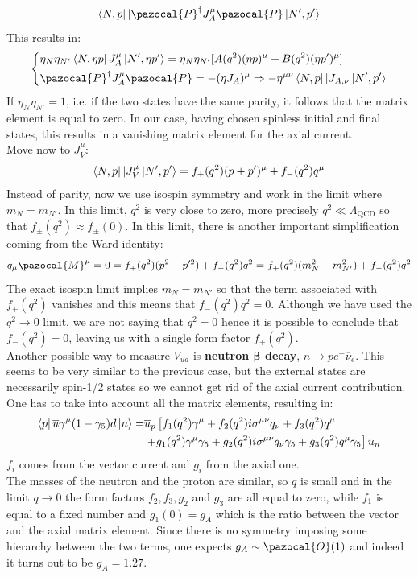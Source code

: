 \documentclass[../main.tex]{subfiles}
\begin{document}
\[
\bra{N,p}|\pazocal{P}^\dagger J_A^\mu\pazocal{P}\ket{N',p'}
\]
This results in:
\[
\left\{
\begin{aligned}
&\eta_N\eta_{N'}\bra{N,\eta p}J_A^\mu\ket{N',\eta p'}=\eta_N\eta_{N'}[A(q^2)(\eta p)^\mu+B(q^2)(\eta p')^\mu]\\
&\pazocal{P}^\dagger J_A^\mu\pazocal{P}=-(\eta J_A)^\mu\Rightarrow-\eta^{\mu\nu}\bra{N,p}|J_{A,\nu}\ket{N',p'}
\end{aligned}
\right.
\]
If $\eta_N\eta_{N'}=1$, i.e. if the two states have the same parity, it follows that the matrix element is equal to zero. In our case, having chosen spinless initial and final states, this results in a vanishing matrix element for the axial current.\\
Move now to $J_V^\mu$:
\[
\bra{N,p}|J_V^\mu\ket{N',p'}=f_+(q^2)(p+p')^\mu+f_-(q^2)q^\mu
\]
Instead of parity, now we use isospin symmetry and work in the limit where $m_N=m_{N'}$. In this limit, $q^2$ is very close to zero, more precisely $q^2\ll\Lambda_{\text{QCD}}$ so that $f_\pm(q^2)\approx f_\pm(0)$. In this limit, there is another important simplification coming from the Ward identity:
\[
q_\mu\pazocal{M}^\mu=0=f_+(q^2)(p^2-p'^2)+f_-(q^2)q^2=f_+(q^2)(m_N^2-m_{N'}^2)+f_-(q^2)q^2
\]
The exact isospin limit implies $m_N=m_{N'}$ so that the term associated with $f_+(q^2)$ vanishes and this means that $f_-(q^2)q^2=0$. Although we have used the $q^2\to0$ limit, we are not saying that $q^2=0$ hence it is possible to conclude that $f_-(q^2)=0$, leaving us with a single form factor $f_+(q^2)$.\\
Another possible way to measure $V_{ud}$ is \textbf{neutron $\mathbf{\beta}$ decay}, $n\to pe^-\overline{\nu}_e$. This seems to be very similar to the previous case, but the external states are necessarily spin-1/2 states so we cannot get rid of the axial current contribution. One has to take into account all the matrix elements, resulting in:
\begin{align*}
\bra{p}\overline{u}\gamma^\mu(1-\gamma_5)d\ket{n}=&\overline{u}_p\left[f_1(q^2)\gamma^\mu+f_2(q^2)i\sigma^{\mu\nu}q_\nu+f_3(q^2)q^\mu\right.\\
&\left.+g_1(q^2)\gamma^\mu\gamma_5+g_2(q^2)i\sigma^{\mu\nu}q_\nu\gamma_5+g_3(q^2)q^\mu\gamma_5\right]u_n
\end{align*}
$f_i$ comes from the vector current and $g_i$ from the axial one.\\
The masses of the neutron and the proton are similar, so $q$ is small and in the limit $q\to0$ the form factors $f_2, f_3, g_2$ and $g_3$ are all equal to zero, while $f_1$ is equal to a fixed number and $g_1(0)=g_A$ which is the ratio between the vector and the axial matrix element. Since there is no symmetry imposing some hierarchy between the two terms, one expects $g_A\sim\pazocal{O}(1)$ and indeed it turns out to be $g_A=1.27$.\\
\end{document}
